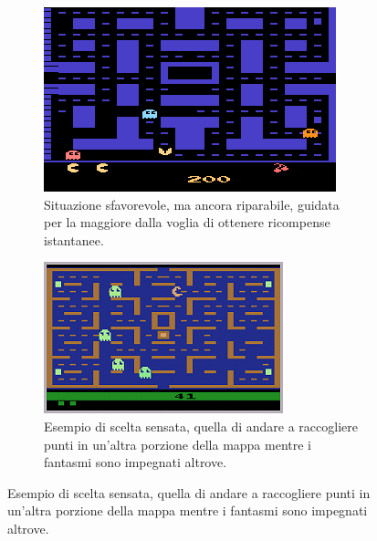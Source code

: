 \documentclass[twoside,twocolumn,10pt]{extarticle}
\theoremstyle{definition}
\begin{document}
		\begin{figure}[ht!]
			\centering
			
			\begin{subfigure}[b]{.49\textwidth}
				\includegraphics[scale=1.05]{images/pacman.png}
				\caption{Situazione sfavorevole, ma ancora riparabile, guidata per la maggiore dalla voglia di ottenere ricompense istantanee.}
				\label{fig:subpacman}
			\end{subfigure}

			\begin{subfigure}[b]{.49\textwidth}
				\includegraphics[scale=1.3]{images/pacman1.png}
				\caption{Esempio di scelta sensata, quella di andare a raccogliere punti in un'altra porzione della mappa mentre i fantasmi sono impegnati altrove.}
				\label{fig:subpacman1}
			\end{subfigure}
			
			\label{fig:pacman}
		\end{figure}
	
\end{document}
